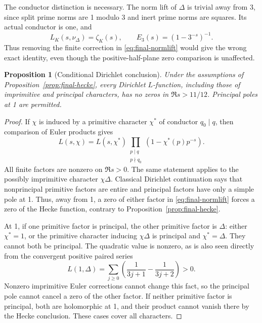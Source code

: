 \documentclass[11pt]{article}
\numberwithin{equation}{section}
\newtheorem{proposition}[theorem]{Proposition}
\theoremstyle{definition}
\theoremstyle{remark}
\begin{document}
The conductor distinction is necessary. The norm lift of \(\Delta\)
is trivial away from 3, since split prime norms are 1 modulo 3 and inert
prime norms are squares. Its actual conductor is one, and
\[
 L_K(s,\nu_\Delta)=\zeta_K(s),\qquad
 E_3(s)=(1-3^{-s})^{-1}.
\]
Thus removing the finite correction in
\eqref{eq:final-normlift} would give the wrong exact identity, even
though the positive-half-plane zero comparison is unaffected.

\begin{proposition}[Conditional Dirichlet conclusion]
\label{prop:final-dirichlet}
Under the assumptions of Proposition~\ref{prop:final-hecke}, every
Dirichlet \(L\)-function, including those of imprimitive and principal
characters, has no zeros in \(\Re s>11/12\). Principal poles at 1
are permitted.
\end{proposition}

\begin{proof}
If \(\chi\) is induced by a primitive character \(\chi^*\) of
conductor \(q_0\mid q\), then comparison of Euler products gives
\[
 L(s,\chi)=L(s,\chi^*)
       \prod_{\substack{p\mid q\\p\nmid q_0}}
       (1-\chi^*(p)p^{-s}).
\]
All finite factors are nonzero on \(\Re s>0\). The same statement
applies to the possibly imprimitive character \(\chi\Delta\).
Classical Dirichlet continuation \cite[Section 25.15]{DLMF} says
that nonprincipal primitive factors are entire and principal factors
have only a simple pole at 1. Thus, away from 1, a zero of either factor
in \eqref{eq:final-normlift} forces a zero of the Hecke function,
contrary to Proposition~\ref{prop:final-hecke}.

At 1, if one primitive factor is principal, the other primitive factor
is \(\Delta\): either \(\chi^*=1\), or the primitive character
inducing \(\chi\Delta\) is principal and \(\chi^*=\Delta\).
They cannot both be principal. The quadratic value is nonzero, as is
also seen directly from the convergent positive paired series
\[
 L(1,\Delta)=\sum_{j\ge0}
       \left(\frac1{3j+1}-\frac1{3j+2}\right)>0.
\]
Nonzero imprimitive Euler corrections cannot change this fact, so the
principal pole cannot cancel a zero of the other factor. If neither
primitive factor is principal, both are holomorphic at 1, and their
product cannot vanish there by the Hecke conclusion. These cases cover
all characters.
\end{proof}
\end{document}
